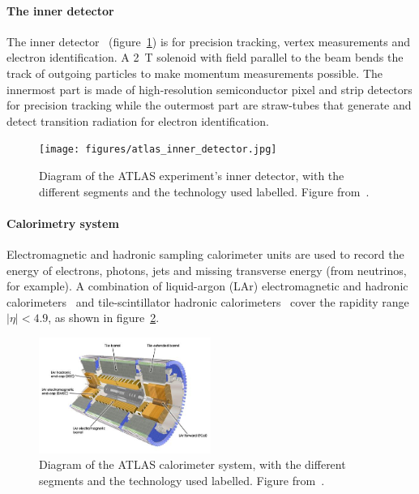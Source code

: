 \paragraph*{The inner detector} \hfill \break
The inner detector~\cite{atlas_inner_detector_tdr_1, atlas_inner_detector_tdr_2} (figure~\ref{fig:atlas_inner_detector}) is for precision tracking, vertex measurements and electron identification. A \SI{2}{\tesla} solenoid with field parallel to the beam bends the track of outgoing particles to make momentum measurements possible. The innermost part is made of high-resolution semiconductor pixel and strip detectors for precision tracking while the outermost part are straw-tubes that generate and detect transition radiation for electron identification.

\begin{figure}
    \centering
    \texttt{[image: figures/atlas\_inner\_detector.jpg]}
    \caption{Diagram of the ATLAS experiment's inner detector, with the different segments and the technology used labelled. Figure from~\cite{collaboration_atlas_2008}.}
    \label{fig:atlas_inner_detector}
\end{figure}

\paragraph*{Calorimetry system} \hfill \break
Electromagnetic and hadronic sampling calorimeter units are used to record the energy of electrons, photons, jets and missing transverse energy (from neutrinos, for example). A combination of liquid-argon (LAr) electromagnetic and hadronic calorimeters~\cite{atlas_lar_cal_tdr} and tile-scintillator hadronic calorimeters~\cite{atlas_tile_cal_tdr} cover the rapidity range $|\eta| < 4.9$, as shown in figure~\ref{fig:atlas_calorimeter}.

\begin{figure}
    \centering
    \includegraphics[width = 0.5\textwidth]{figures/atlas_calorimeter.png}
    \caption{Diagram of the ATLAS calorimeter system, with the different segments and the technology used labelled. Figure from~\cite{collaboration_atlas_2008}.}
    \label{fig:atlas_calorimeter}
\end{figure}

